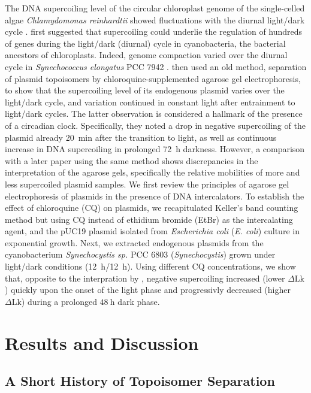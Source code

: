\documentclass[10pt,a4]{article}
\def\cite#1{\hypersetup{citecolor=Teal}\citep{#1}} %
\newcommand{\scyst}{\textit{Synechocystis}}
\newcommand{\dlk}{\ensuremath{\Delta\text{Lk}}}
\begin{document}
%
The DNA supercoiling level of the circular chloroplast genome of the
single-celled algae \textit{Chlamydomonas reinhardtii} showed
fluctuations with the diurnal light/dark cycle \cite{Salvador1998}.
\citet{Mori2001} first suggested that supercoiling could underlie the
regulation of hundreds of genes during the light/dark (diurnal) cycle
in cyanobacteria, the bacterial ancestors of chloroplasts. Indeed,
genome compaction varied over the diurnal cycle in
\textit{Synechococcus elongatus} PCC 7942
\cite{Smith2006}. \citet{Woelfle2007} then used an old method,
separation of plasmid topoisomers by chloroquine-supplemented agarose
gel electrophoresis, to show that the supercoiling level of its
endogenous plasmid varies over the light/dark cycle, and variation
continued in constant light after entrainment to light/dark
cycles. The latter observation is considered a hallmark of the
presence of a circadian clock.  Specifically, they noted a drop in
negative supercoiling of the plasmid already \SI{20}{\minute} after
the transition to light, as well as continuous increase in DNA
supercoiling in prolonged \SI{72}{\hour} darkness. However, a
comparison with a later paper using the same method \cite{Vijayan2009}
shows discrepancies in the interpretation of the agarose gels,
specifically the relative mobilities of more and less supercoiled
plasmid samples.
%
We first review the principles of agarose gel electrophoresis of
plasmids in the presence of DNA intercalators.  To establish the
effect of chloroquine (CQ) on plasmids, we recapitulated Keller's band
counting method but using CQ instead of ethidium bromide (EtBr) as the
intercalating agent, and the pUC19 plasmid isolated from
\textit{Escherichia coli} (\textit{E. coli}) culture in exponential
growth. Next, we extracted endogenous plasmids from the cyanobacterium
\textit{Synechocystis sp.}  PCC 6803 (\scyst{}) grown under light/dark
conditions (\SI{12}{\hour}/\SI{12}{\hour}). Using different CQ
concentrations, we show that, opposite to the interpration by
\citet{Woelfle2007}, negative supercoiling increased (lower $\dlk$)
quickly upon the onset of the light phase and progressivly decreased
(higher $\dlk$) during a prolonged $\SI{48}{\hour}$ dark phase.

\section{Results and Discussion}

\subsection{A Short History of Topoisomer Separation}
\end{document}
